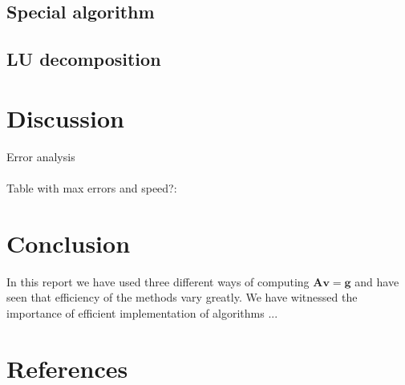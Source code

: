 \documentclass[american,a4paper,12pt]{article}
\renewcommand{\vec}[1]{\mathbf{#1}} %
\begin{document}
\subsection{Special algorithm}

\subsection{LU decomposition}

\section{Discussion}
Error analysis \\
\\
Table with max errors and speed?:

\section{Conclusion}
In this report we have used three different ways of computing $\vec{A}\vec{v} = \vec{g}$ and have seen that efficiency of the methods vary greatly. We have witnessed the importance of efficient implementation of algorithms ...


\section{References} %
\end{document}
